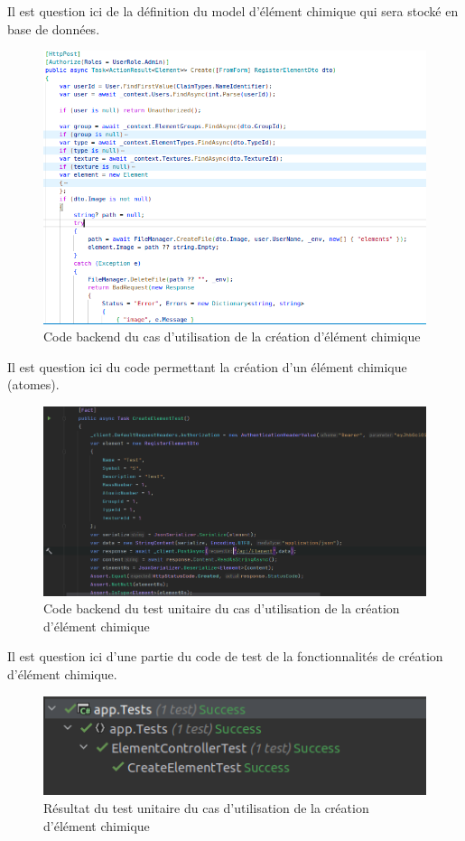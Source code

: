 Il est question ici de la définition du model d'élément chimique qui sera stocké en base de données.

\begin{figure}[H]
	\centering
	\includegraphics[width=1\textwidth]{img/cep}
	\caption{Code backend du cas d'utilisation de la création d'élément chimique}
	\label{fig:mesh1}
\end{figure}

Il est question ici du code permettant la création d'un élément chimique (atomes).

\begin{figure}[H]
	\centering
	\includegraphics[width=1\textwidth]{img/cet}
	\caption{Code backend du test unitaire du cas d'utilisation de la création d'élément chimique}
	\label{fig:mesh1}
\end{figure}

Il est question ici d'une partie du code de test de la fonctionnalités de création d'élément chimique.

\begin{figure}[H]
	\centering
	\includegraphics[width=1\textwidth]{img/ute}
	\caption{Résultat du test unitaire du cas d'utilisation de la création d'élément chimique}
	\label{fig:mesh1}
\end{figure}


